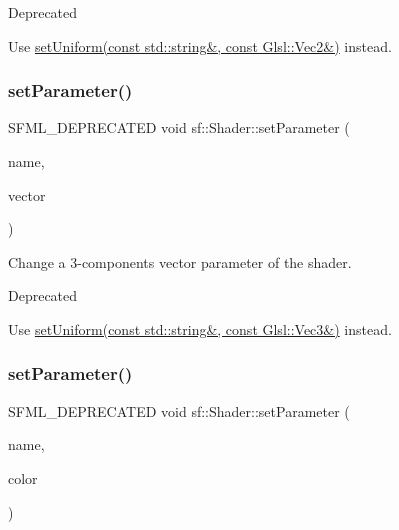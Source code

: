 \begin{DoxyRefDesc}{Deprecated}
\item[\hyperlink{deprecated__deprecated000011}{Deprecated}]Use \hyperlink{classsf_1_1_shader_a4a2c673c41e37b17d67e4af1298b679f}{set\+Uniform(const std\+::string\&, const Glsl\+::\+Vec2\&)} instead.\end{DoxyRefDesc}
\mbox{\label{classsf_1_1_shader_abf1eb5e74f216c7bcfaf34d08c960ee0}} 
\subsubsection{\texorpdfstring{set\+Parameter()}{setParameter()}\hspace{0.1cm}{\footnotesize\ttfamily [6/10]}}
{\footnotesize\ttfamily S\+F\+M\+L\+\_\+\+D\+E\+P\+R\+E\+C\+A\+T\+ED void sf\+::\+Shader\+::set\+Parameter (\begin{DoxyParamCaption}\item[{const std\+::string \&}]{name,  }\item[{const \hyperlink{classsf_1_1_vector3}{Vector3f} \&}]{vector }\end{DoxyParamCaption})}



Change a 3-\/components vector parameter of the shader. 

\begin{DoxyRefDesc}{Deprecated}
\item[\hyperlink{deprecated__deprecated000012}{Deprecated}]Use \hyperlink{classsf_1_1_shader_aad654ad8de6f0c56191fa7b8cea21db2}{set\+Uniform(const std\+::string\&, const Glsl\+::\+Vec3\&)} instead.\end{DoxyRefDesc}
\mbox{\label{classsf_1_1_shader_a66e68e64c06ef5501e50dd5903cab51c}} 
\subsubsection{\texorpdfstring{set\+Parameter()}{setParameter()}\hspace{0.1cm}{\footnotesize\ttfamily [7/10]}}
{\footnotesize\ttfamily S\+F\+M\+L\+\_\+\+D\+E\+P\+R\+E\+C\+A\+T\+ED void sf\+::\+Shader\+::set\+Parameter (\begin{DoxyParamCaption}\item[{const std\+::string \&}]{name,  }\item[{const \hyperlink{classsf_1_1_color}{Color} \&}]{color }\end{DoxyParamCaption})}



